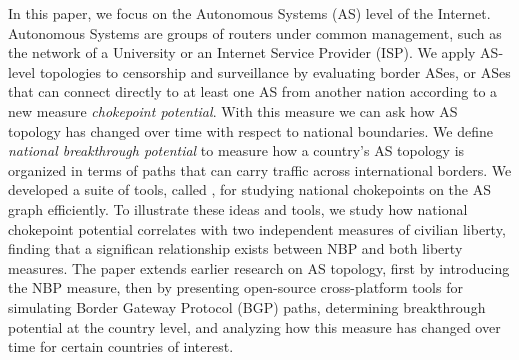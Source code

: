 \par
In this paper, we focus on the Autonomous Systems (AS) level of the Internet.
Autonomous Systems are groups of routers under common management, such as the network of
a University or an Internet Service Provider (ISP). We apply AS-level topologies to
censorship and surveillance by evaluating border ASes, or ASes that can connect directly to at least
one AS from another nation according to a new measure \emph{chokepoint potential}.
With this measure we can ask how AS topology has changed over time with respect
to national boundaries.  We define \emph{national breakthrough potential} to
measure how a country's AS topology is organized in terms of paths
that can carry traffic across international borders. We developed a
suite of tools, called \toolname{}, for studying national chokepoints on
the AS graph efficiently. To illustrate these ideas and tools, we
study how national chokepoint potential correlates with two independent
measures of civilian liberty, finding that a significan relationship exists between NBP and both liberty measures.
The paper extends earlier research on AS topology, first by introducing the NBP measure, 
then by presenting open-source cross-platform tools for simulating Border Gateway Protocol (BGP) paths,
determining breakthrough potential at the country level, and analyzing how this measure has changed over time for certain countries of interest.





